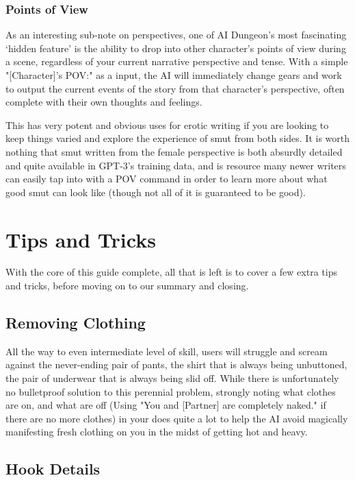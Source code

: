 ﻿\documentclass[Coomer-main.tex]{subfiles}
\begin{document}
\subsection{Points of View}

As an interesting sub-note on perspectives, one of AI Dungeon's most fascinating ‘hidden feature’ is the ability to drop into other character's points of view during a scene, regardless of your current narrative perspective and tense. With a simple "[Character]'s POV:" as a \story  input, the AI will immediately change gears and work to output the current events of the story from that character's perspective, often complete with their own thoughts and feelings.

This has very potent and obvious uses for erotic writing if you are looking to keep things varied and explore the experience of smut from both sides. It is worth nothing that smut written from the female perspective is both absurdly detailed and quite available in GPT-3's training data, and is resource many newer writers can easily tap into with a POV command in order to learn more about what good smut can look like (though not all of it is guaranteed to be good).

\chapter{Tips and Tricks}

With the core of this guide complete, all that is left is to cover a few extra tips and tricks, before moving on to our summary and closing.

\section{Removing Clothing}

All the way to even intermediate level of skill, users will struggle and scream against the never-ending pair of pants, the shirt that is always being unbuttoned, the pair of underwear that is always being slid off. While there is unfortunately no bulletproof solution to this perennial problem, strongly noting what clothes are on, and what are off (Using "You and [Partner] are completely naked." if there are no more clothes) in your \rem does quite a lot to help the AI avoid magically manifesting fresh clothing on you in the midst of getting hot and heavy.

\section{Hook Details}
\end{document}
